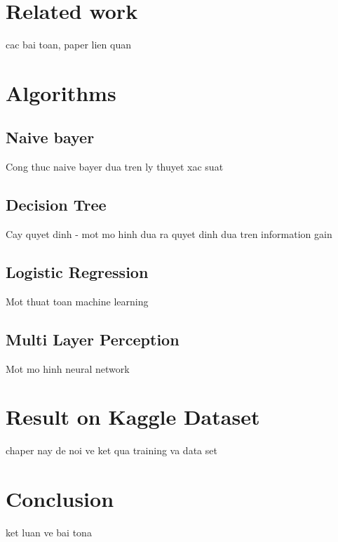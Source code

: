 \documentclass[12pt]{report}
\begin{document}

\chapter{Related work}
cac bai toan, paper lien quan
\chapter{Algorithms}

\section{Naive bayer}
Cong thuc naive bayer dua tren ly thuyet xac suat

\section{Decision Tree}
Cay quyet dinh - mot mo hinh dua ra quyet dinh dua tren information gain

\section{Logistic Regression}
Mot thuat toan machine learning

\section{Multi Layer Perception}
Mot mo hinh neural network

\chapter{Result on Kaggle Dataset}
chaper nay de noi ve ket qua training va data set 

\chapter{Conclusion}
ket luan ve bai tona
\end{document}

